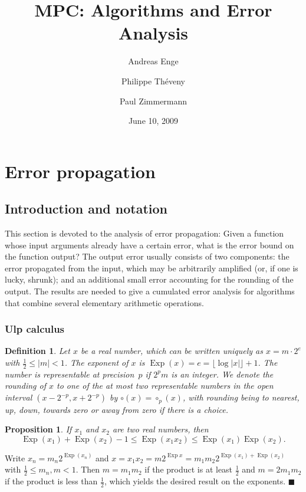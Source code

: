 \documentclass {article}
\title {MPC: Algorithms and Error Analysis}
\author {Andreas Enge \and Philippe Th\'eveny \and Paul Zimmermann}
\date {June 10, 2009}
\DeclareMathOperator{\Exp}{\operatorname {Exp}}
\renewcommand {\leq}{\leqslant}
\newtheorem{definition}[theorem]{Definition}
\newtheorem{prop}[theorem]{Proposition}
\newenvironment{proof}{\noindent{\bf Proof:}}{{\hspace* {\fill}$\blacksquare$}}
\begin{document}
\maketitle
\tableofcontents


\section {Error propagation}

\subsection {Introduction and notation}

This section is devoted to the analysis of error propagation: Given a function
whose input arguments already have a certain error, what is the error bound on
the function output? The output error usually consists of two components: the
error propagated from the input, which may be arbitrarily amplified (or, if
one is lucky, shrunk); and an
additional small error accounting for the rounding of the output. The results
are needed to give a cumulated error analysis for algorithms that combine
several elementary arithmetic operations.


\subsubsection {Ulp calculus}

\begin {definition}
\label {def:exp}
Let $x$ be a real number, which can be written uniquely as
$x = m \cdot 2^e$ with $\frac{1}{2} \le |m| < 1$.
The {\em exponent} of $x$ is
$\Exp(x) = e = \lfloor \log |x| \rfloor + 1$.
The number is {\em representable at precision~$p$} if
$2^p m$ is an integer.
We denote the rounding of $x$ to one of the at most two representable
numbers in the open interval $(x - 2^{-p}, x + 2^{-p})$ by
$\circ (x) = \circ_p (x)$, with rounding being to nearest, up, down,
towards zero or away from zero if there is a choice.
\end {definition}

\begin {prop}
\label {prop:expmul}
If $x_1$ and $x_2$ are two real numbers, then
\[
\Exp (x_1) + \Exp (x_2) - 1 \leq \Exp (x_1 x_2) \leq \Exp (x_1) \Exp (x_2).
\]
\end {prop}

\begin {proof}
Write $x_n = m_n 2^{\Exp (x_n)}$ and
$x = x_1 x_2 = m 2^{\Exp x} = m_1 m_2 2^{\Exp (x_1) + \Exp (x_2)}$
with $\frac {1}{2} \leq m_n, m < 1$.
Then $m = m_1 m_2$ if the product is at least $\frac {1}{2}$ and
$m = 2 m_1 m_2$ if the product is less than $\frac {1}{2}$, which
yields the desired result on the exponents.
\end {proof}
\end{document}
